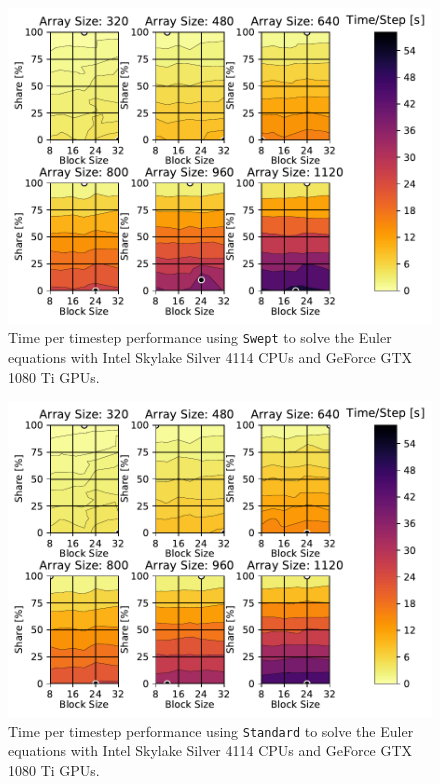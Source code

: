 \documentclass[mca,article,submit,moreauthors,pdftex]{Definitions/mdpi}
\def\Swept{\texttt{Swept}}
\def\Standard{\texttt{Standard}}
\def\oldCPU{Intel Skylake Silver 4114} %
\def\oldGPU{GeForce GTX 1080 Ti}
\begin{document}
\begin{figure}[htbp]
    \widefigure
    \includegraphics[scale=0.85]{figs/timePerStepSwepteulerOld.pdf}
    \caption{Time per timestep performance using \Swept{} to solve the Euler equations with \oldCPU{} CPUs and \oldGPU{} GPUs.}
    \label{fig:tptoldEulerSwept} 
\end{figure}

\begin{figure}[htbp]
    \widefigure
    \includegraphics[scale=0.85]{figs/timePerStepStandardeulerOld.pdf}
    \caption{Time per timestep performance using \Standard{}{} to solve the Euler equations with \oldCPU{} CPUs and \oldGPU{} GPUs.}
    \label{fig:tptoldEulerStandard} 
\end{figure}
\end{document}
